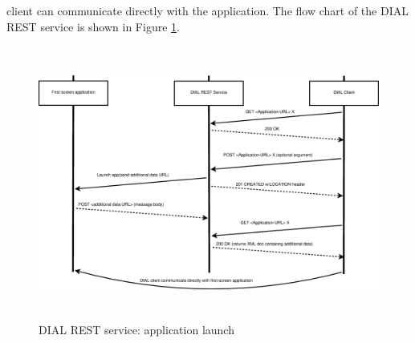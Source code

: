 client can communicate directly with the application. The flow chart of  the
DIAL REST service is  shown in Figure \ref{dial_rest}.
\begin{figure}[htb] \centering \includegraphics[height=9cm]{charts/dial_rest} 
\caption{DIAL REST service: application launch \label{dial_rest}} 
\end{figure} 

